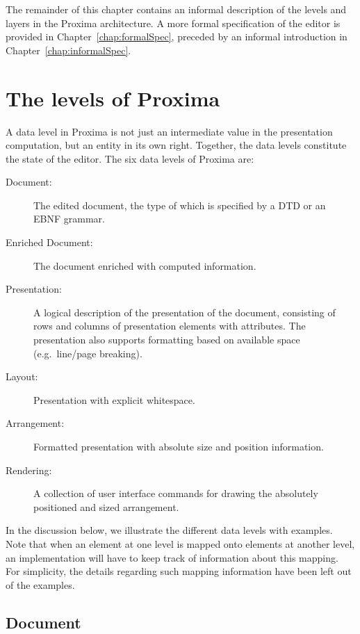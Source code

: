 \documentclass{speauth}
\begin{document}
The remainder of this chapter contains an informal description of the levels and layers in the Proxima architecture. A more formal specification of the editor is provided in Chapter~\ref{chap:formalSpec}, preceded by an informal introduction in Chapter~\ref{chap:informalSpec}.


%																
%																
%																
\section{The levels of Proxima}

A data level in Proxima is not just an intermediate value in the presentation computation, but an entity in its own right. Together, the data levels constitute the state of the editor. The six data levels of Proxima are:


\begin{description}
\item[Document:] The edited document, the type of which is specified by a DTD or an EBNF grammar.

\item[Enriched Document:] The document enriched with computed information.

\item[Presentation:] A logical description of the presentation of the document, consisting of rows and columns of presentation elements with attributes. The presentation also supports formatting based on available space (e.g.\ line/page breaking).

\item[Layout:]  Presentation with explicit whitespace.

\item[Arrangement:] Formatted presentation with absolute size and position information.

\item[Rendering:] A collection of user interface commands for drawing the absolutely positioned and sized arrangement.
\end{description}

In the discussion below, we illustrate the different data levels with examples. Note that when an element at one level is mapped onto elements at another level, an implementation will have to keep track of information about this mapping. For simplicity, the details regarding such mapping information have been left out of the examples.

%																
\subsection{Document} \label {sect:docLevel}
\end{document}
